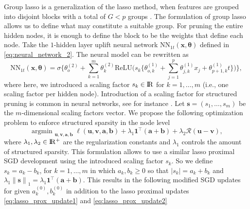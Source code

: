 \documentclass{article}
\def\R{\mathcal R}
\def\x{\mathbf x}
\def \real{\rm I\!R}
\def \vahid {\color{magenta}}
\newcommand{\norm}[1]{\left\lVert#1\right\rVert}
\DeclareMathOperator*{\argmin}{argmin~} %
\begin{document}
Group lasso is a generalization of the lasso method, when features are grouped into disjoint blocks with a total of $G<p$ groups \citep{yuan2006model}. The formulation of group lasso allows us to define what may constitute a suitable group. For pruning the entire hidden nodes, it is enough to define the block to be the weights that define each node. Take the $1$-hidden layer uplift neural network $\mathrm{NN}_{1t}(\x, \boldsymbol{\theta})$ defined in \eqref{eq:neural_network_2}. The neural model can be rewritten as
\begin{equation}
    \mathrm{NN}_{1t}(\x, \boldsymbol{\theta}) = \sigma \biggl\{ \theta_o^{(2)} + \sum_{k=1}^{m} \theta_k^{(2)}  \mathrm{ReLU}\Big(s_k \{\theta_{o,k}^{(1)} + \sum_{j=1}^{p} \theta_{j,k}^{(1)} x_j +  \theta_{p+1,k}^{(1)} t \} \Big)  \biggr\},
    \label{eq:neural_network_2_scaling_factor}
\end{equation}
where here, we introduced a scaling factor $s_k  \in \real$ for $k=1,\ldots,m$ (i.e., one scaling factor per hidden node). Introduction of a scaling factor for structured pruning is common in neural networks, see for instance \cite{ramakrishnan2020differentiable}.
Let $\mathbf s = (s_1, \ldots, s_m)$ be the $m$-dimensional scaling factors vector. We propose the following optimization problem to enforce structured sparsity in the node level
%
$$\argmin_{\mathbf u, \mathbf v, \mathbf a, \mathbf b} \ell(\mathbf u, \mathbf v, \mathbf a, \mathbf b) + \lambda_1 \mathbf 1^\top({\mathbf a + \mathbf b}) + \lambda_2 \R(\mathbf u-\mathbf v),$$
where $\lambda_1, \lambda_2 \in \real^+$ are the regularization constants and $
\lambda_1 $ controls the amount of structured sparsity. This formulation allows to use a similar lasso proximal SGD development using the introduced scaling factor $s_k$. So we define $s_k= a_k-b_k$, for $k=1,\ldots,m$ in which $a_k,b_k\geq 0$ so that $|s_k| = a_k+b_k$ and $\lambda_1 \norm{\mathbf s}_1 = \lambda_1 \mathbf 1^\top(\mathbf a+\mathbf b)$. This results in the following modified SGD updates for
given  $a_k^{(0)}, b_k^{(0)}$ in addition to the lasso proximal updates \eqref{eq:lasso_prox_update1} and \eqref{eq:lasso_prox_update2}
\end{document}

